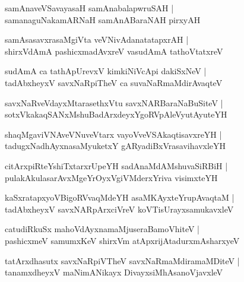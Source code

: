 \documentclass[twoside,12pt,openright]{book}
\newcounter{shloka}[chapter]
\begin{document}
\begin{shloka}%
samAnaveVSavayasaH samAnabalapwruSAH |\\
samanaguNakamARNaH samAnABaraNAH pirxyAH 
\end{shloka}

\begin{shloka}%
samAsasavxrasaMgiVta veVNivAdanatatapxrAH |\\
shirxVdAmA pashicxmadAvxreV vasudAmA tathoVtatxreV 
\end{shloka}

\begin{shloka}%
sudAmA ca tathApUrevxV kimkiNiVcApi dakiSxNeV |\\
tadAbxheyxV savxNaRpiTheV ca suvaNaRmaMdirAvaqteV 
\end{shloka}

\begin{shloka}%
savxNaRveVdayxMtarasethxVtu savxNARBaraNaBuSiteV |\\
sotxVkakaqSANxMshuBadArxdeyxYgoRVpAleVyutAyuteYH
\end{shloka}

\begin{shloka}%
shaqMgaviVNAveVNuveVtarx vayoVveVSAkaqtisavxreYH |\\
tadugxNadhAyxnasaMyuketxY gARyadiBxVrasavihavxleYH
\end{shloka}

\begin{shloka}%
citArxpiRteYshiTxtarxrUpeYH sadAnaMdAMshuvaSiRBiH |\\
pulakAkulasarAvxMgeYrOyxVgiVMderxYriva visimxteYH
\end{shloka}

\begin{shloka}%
kaSxratapxyoVBigoRVvaqMdeYH asaMKAyxteYrupAvaqtaM |\\
tadAbxheyxV savxNARpArxciVreV koVTisUrayxsamukavxleV 
\end{shloka}

\begin{shloka}%
catudiRkuSx mahoVdAyxnamaMjuseraBamoVhiteV |\\
pashicxmeV samumxKeV shirxVm atApxrijAtadurxmAsharxyeV 
\end{shloka}

\begin{shloka}%
tatArxdhasutx savxNaRpiVTheV savxNaRmaMdiramaMDiteV |\\
tanamxdheyxV maNimANikayx DivayxsiMhAsanoVjavxleV
\end{shloka}
\end{document}
